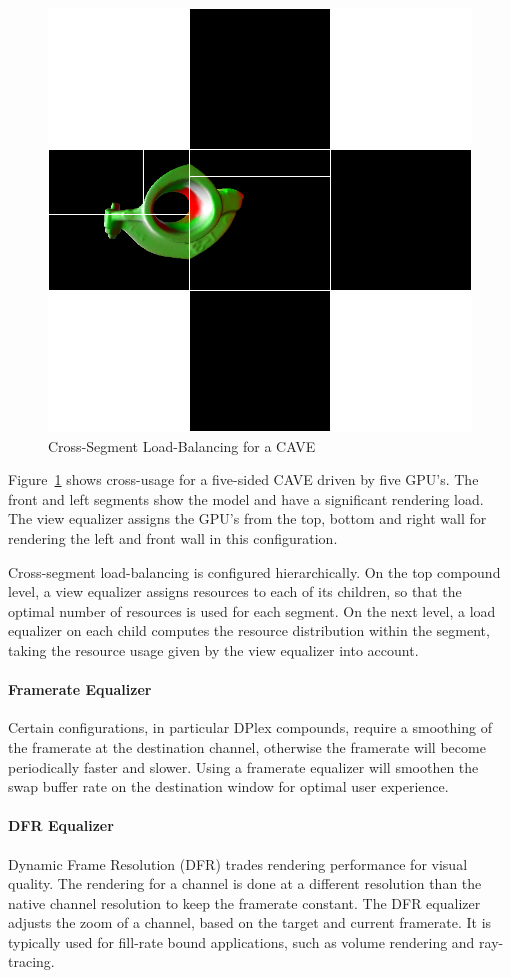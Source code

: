\documentclass[10pt,a4]{scrartcl}
\newcommand{\fig}[1]{Figure~\ref{#1}}
\begin{document}
\begin{figure} 
    \includegraphics[width=.382\textwidth]{images/viewLB.png}
    {\caption{\label{fViewLoadBalancing2}\small Cross-Segment
        Load-Balancing for a CAVE}}
\end{figure}
\fig{fViewLoadBalancing2} shows cross-usage for a five-sided CAVE driven
by five GPU's. The front and left segments show the model and have a
significant rendering load. The view equalizer assigns the GPU's from
the top, bottom and right wall for rendering the left and front wall in
this configuration.

Cross-segment load-balan\-cing is configured hierarchically. On the top
compound level, a view equalizer assigns resources to each of its
children, so that the optimal number of resources is used for each
segment. On the next level, a load equalizer on each child computes the
resource distribution within the segment, taking the resource usage
given by the view equalizer into account.

\paragraph{Framerate Equalizer}
Certain configurations, in particular DPlex compounds, require a
smoothing of the framerate at the destination channel, otherwise the
framerate will become periodically faster and slower. Using a framerate
equalizer will smoothen the swap buffer rate on the destination window
for optimal user experience.

\paragraph{DFR Equalizer}

Dynamic Frame Resolution (DFR) trades rendering performance for visual
quality. The rendering for a channel is done at a different resolution
than the native channel resolution to keep the framerate constant. The
DFR equalizer adjusts the zoom of a channel, based on the target and
current framerate. It is typically used for fill-rate bound
applications, such as volume rendering and ray-tracing.
\end{document}
